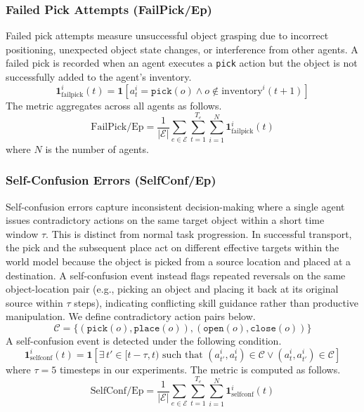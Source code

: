 \documentclass{article}
\theoremstyle{plain}
\theoremstyle{definition}
\theoremstyle{remark}
\begin{document}
\subsubsection{Failed Pick Attempts (FailPick/Ep)}

Failed pick attempts measure unsuccessful object grasping due to incorrect positioning, unexpected object state changes, or interference from other agents. A failed pick is recorded when an agent executes a \texttt{pick} action but the object is not successfully added to the agent's inventory.
\begin{equation}
    \mathbf{1}_{\text{failpick}}^i(t) = \mathbf{1}\left[ a_t^i = \texttt{pick}(o) \land o \notin \text{inventory}^i(t+1) \right]
\end{equation}
The metric aggregates across all agents as follows.
\begin{equation}
    \text{FailPick/Ep} = \frac{1}{|\mathcal{E}|} \sum_{e \in \mathcal{E}} \sum_{t=1}^{T_e} \sum_{i=1}^{N} \mathbf{1}_{\text{failpick}}^i(t)
\end{equation}
where $N$ is the number of agents.

\subsubsection{Self-Confusion Errors (SelfConf/Ep)}

Self-confusion errors capture inconsistent decision-making where a single agent issues contradictory actions on the same target object within a short time window $\tau$. This is distinct from normal task progression. In successful transport, the pick and the subsequent place act on different effective targets within the world model because the object is picked from a source location and placed at a destination. A self-confusion event instead flags repeated reversals on the same object-location pair (e.g., picking an object and placing it back at its original source within $\tau$ steps), indicating conflicting skill guidance rather than productive manipulation. We define contradictory action pairs below.
\begin{equation}
    \mathcal{C} = \{(\texttt{pick}(o), \texttt{place}(o)), (\texttt{open}(o), \texttt{close}(o))\}
\end{equation}
A self-confusion event is detected under the following condition.
\begin{equation}
    \mathbf{1}_{\text{selfconf}}^i(t) = \mathbf{1}\left[ \exists\, t' \in [t-\tau, t) \text{ such that } (a_{t'}^i, a_t^i) \in \mathcal{C} \lor (a_t^i, a_{t'}^i) \in \mathcal{C} \right]
\end{equation}
where $\tau = 5$ timesteps in our experiments. The metric is computed as follows.
\begin{equation}
    \text{SelfConf/Ep} = \frac{1}{|\mathcal{E}|} \sum_{e \in \mathcal{E}} \sum_{t=1}^{T_e} \sum_{i=1}^{N} \mathbf{1}_{\text{selfconf}}^i(t)
\end{equation}
\end{document}
